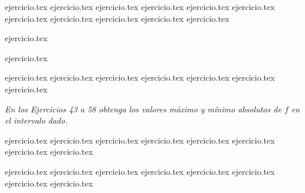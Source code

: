 \begin{enumerate}
    \setcounter{enumi}{22}
    \begin{minipage}{0.45\textwidth}
    {ejercicio.tex}
    {ejercicio.tex}
    {ejercicio.tex}
    {ejercicio.tex}
    {ejercicio.tex}
    {ejercicio.tex}
    {ejercicio.tex}
    {ejercicio.tex}
    {ejercicio.tex}
    {ejercicio.tex}
    {ejercicio.tex}
    \end{minipage}%
    \begin{minipage}{0.45\textwidth}
    \setcounter{enumi}{31}
    {ejercicio.tex}
    \addtocounter{enumi}{1}
    {ejercicio.tex}
    \addtocounter{enumi}{1}
    {ejercicio.tex}
    {ejercicio.tex}
    {ejercicio.tex}
    {ejercicio.tex}
    {ejercicio.tex}
    {ejercicio.tex}
    {ejercicio.tex}
    \end{minipage}
\end{enumerate}

\vspace{1em}
\noindent \textit{En los Ejercicios 43 a 58 obtenga los valores máximo y mínimo absolutos de $f$ en el intervalo dado.}

\begin{enumerate}
    \setcounter{enumi}{42}
    \begin{minipage}{0.45\textwidth}
    {ejercicio.tex}
    {ejercicio.tex}
    {ejercicio.tex}
    {ejercicio.tex}
    {ejercicio.tex}
    {ejercicio.tex}
    {ejercicio.tex}
    {ejercicio.tex}
    \end{minipage}%
    \begin{minipage}{0.45\textwidth}
    \setcounter{enumi}{50}
    {ejercicio.tex}
    {ejercicio.tex}
    {ejercicio.tex}
    {ejercicio.tex}
    {ejercicio.tex}
    {ejercicio.tex}
    {ejercicio.tex}
    {ejercicio.tex}
    \end{minipage}
\end{enumerate}

